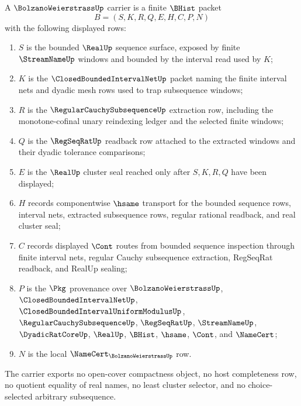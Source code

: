 \begin{definition}
\label{def:bolzano-weierstrass-carrier}
A $\BolzanoWeierstrassUp$ carrier is a finite $\BHist$ packet
$$
B=(S,K,R,Q,E,H,C,P,N)
$$
with the following displayed rows:
\begin{enumerate}
\item $S$ is the bounded $\RealUp$ sequence surface, exposed by finite $\StreamNameUp$ windows and bounded by the interval read used by $K$;
\item $K$ is the $\ClosedBoundedIntervalNetUp$ packet naming the finite interval nets and dyadic mesh rows used to trap subsequence windows;
\item $R$ is the $\RegularCauchySubsequenceUp$ extraction row, including the monotone-cofinal unary reindexing ledger and the selected finite windows;
\item $Q$ is the $\RegSeqRatUp$ readback row attached to the extracted windows and their dyadic tolerance comparisons;
\item $E$ is the $\RealUp$ cluster seal reached only after $S,K,R,Q$ have been displayed;
\item $H$ records componentwise $\hsame$ transport for the bounded sequence rows, interval nets, extracted subsequence rows, regular rational readback, and real cluster seal;
\item $C$ records displayed $\Cont$ routes from bounded sequence inspection through finite interval nets, regular Cauchy subsequence extraction, RegSeqRat readback, and RealUp sealing;
\item $P$ is the $\Pkg$ provenance over $\BolzanoWeierstrassUp$, $\ClosedBoundedIntervalNetUp$, $\ClosedBoundedIntervalUniformModulusUp$, $\RegularCauchySubsequenceUp$, $\RegSeqRatUp$, $\StreamNameUp$, $\DyadicRatCoreUp$, $\RealUp$, $\BHist$, $\hsame$, $\Cont$, and $\NameCert$;
\item $N$ is the local $\NameCert_{\BolzanoWeierstrassUp}$ row.
\end{enumerate}
The carrier exports no open-cover compactness object, no host completeness row, no quotient equality of real names, no least cluster selector, and no choice-selected arbitrary subsequence.
\end{definition}

